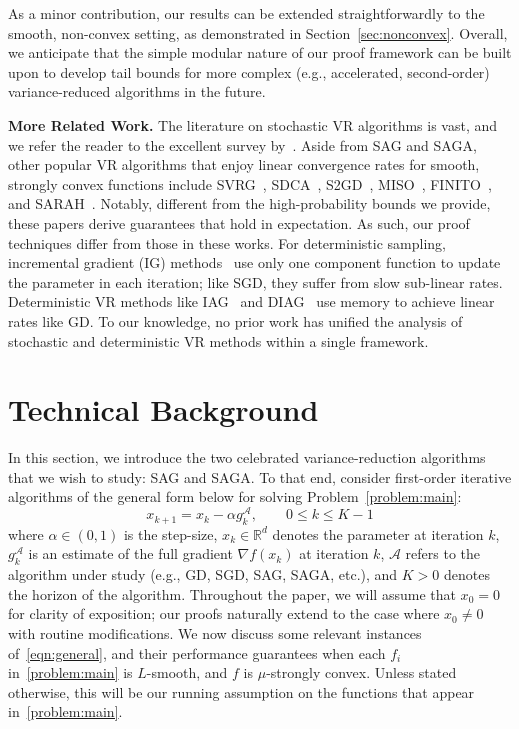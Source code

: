 \documentclass{article}
\theoremstyle{plain}
\theoremstyle{definition}
\newcommand{\R}{\mathbb{R}}
\newcommand{\cA}{\mathcal{A}}
\begin{document}
As a minor contribution, our results can be extended straightforwardly to the smooth, non-convex setting, as demonstrated in Section~\ref{sec:nonconvex}. Overall, we anticipate that the simple modular nature of our proof framework can be built upon to develop tail bounds for more complex (e.g., accelerated, second-order) variance-reduced algorithms in the future.

\textbf{More Related Work.} The literature on stochastic VR algorithms is vast, and we refer the reader to the excellent survey by~\citet{gower2020variance}. Aside from SAG and SAGA, other popular VR algorithms that enjoy linear convergence rates for smooth, strongly convex functions include SVRG~\cite{SVRG}, SDCA~\cite{SDCA}, S2GD~\cite{S2GD}, MISO~\cite{MISO}, FINITO~\cite{FINITO}, and SARAH~\cite{SARAH}. Notably, different from the high-probability bounds we provide, these papers derive guarantees that hold in expectation. As such, our proof techniques differ from those in these works. For deterministic sampling, incremental gradient (IG) methods~\cite{bertsekas2011incremental} use only one component function to update the parameter in each iteration; like SGD, they suffer from slow sub-linear rates. Deterministic VR methods like IAG~\cite{blatt2007convergent} and DIAG~\cite{mokhtari2018surpassing} use memory to achieve linear rates like GD. To our knowledge, no prior work has unified the analysis of stochastic and deterministic VR methods within a single framework.  



\section{Technical Background}\label{sec:prob_formulation}
In this section, we introduce the two celebrated variance-reduction algorithms that we wish to study: SAG and SAGA. To that end, consider first-order iterative algorithms of the general form below for solving Problem~\eqref{problem:main}: 
\begin{equation}
x_{k+1} = x_k - \alpha g_k^\cA,\qquad 0\leq k\leq K-1\label{eqn:general}
\end{equation}
where $\alpha \in (0,1)$ is the step-size, $x_k\in\R^d$ denotes the parameter at iteration $k$, $g_k^\cA$ is an estimate of the full gradient $\nabla f(x_k)$ at iteration $k$, $\cA$ refers to the algorithm under study (e.g., GD, SGD, SAG, SAGA, etc.), and $K>0$ denotes the horizon of the algorithm. Throughout the paper, we will assume that $x_0=0$ for clarity of exposition; our proofs naturally extend to the case where $x_0 \neq 0$ with routine modifications. 
We now discuss some relevant instances of~\eqref{eqn:general}, and their performance  guarantees when each $f_i$ in~\eqref{problem:main} is $L$-smooth, and $f$ is $\mu$-strongly convex. Unless stated otherwise, this will be our running assumption on the functions that appear in~\eqref{problem:main}.
\end{document}
